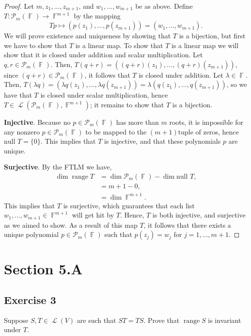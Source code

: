 \documentclass[letterpaper, 12pt]{amsart}
\DeclareMathOperator{\F}{\mathbb{F}}				%
\DeclareMathOperator{\Ell}{\mathscr{L}}				%
\renewcommand{\null}{\text{null }}					%
\DeclareMathOperator{\range}{\text{range }}			%
\theoremstyle{definition}  							%
\begin{document}
		\begin{proof}
		Let $m, z_{1}, \dots, z_{m+1}$, and $w_{1}, \dots, w_{m+1}$ be as above.
		Define $T : \mathcal{P}_{m}(\F) \to \F^{m+1}$ by the mapping $$Tp \mapsto (p(z_{1}), \dots, p(z_{m+1})) = (w_{1}, \dots, w_{m+1}).$$
		We will prove existence and uniqueness by showing that $T$ is a bijection, but first we have to show that $T$ is a linear map.
		To show that $T$ is a linear map we will show that it is closed under addition and scalar multiplication.
		Let $q,r \in \mathcal{P}_{m}(\F)$.
		Then, $T(q+r) = ((q+r)(z_{1}), \dots, (q+r)(z_{m+1}))$, since $(q+r) \in \mathcal{P}_{m}(\F)$, it follows that $T$ is closed under addition.
		Let $\lambda \in \F$.
		Then, $T(\lambda q) = (\lambda q(z_{1}), \dots, \lambda q(z_{m+1})) = \lambda (q(z_{1}), \dots, q(z_{m+1}))$, so we have that $T$ is closed under scalar multiplication, hence $T \in \Ell(\mathcal{P}_{m}(\F), \F^{m+1})$; it remains to show that $T$ is a bijection.

		\textbf{Injective}.
		Because no $p \in \mathcal{P}_{m}(\F)$ has more than $m$ roots, it is impossible for any nonzero $p \in \mathcal{P}_{m}(\F)$ to be mapped to the $(m+1)$tuple of zeros, hence $\null T = \{ 0 \}$.
		This implies that $T$ is injective, and that these polynomials $p$ are unique.

		\textbf{Surjective}.
		By the FTLM we have,
		\begin{align*}
			\dim \range T &= \dim \mathcal{P}_{m}(\F) - \dim \null T, \\
			&= m + 1 - 0, \\
			&= \dim \F^{m+1}.
		\end{align*}
		This implies that $T$ is surjective, which guarantees that each list $w_{1},\dots,w_{m+1} \in \F^{m+1}$ will get hit by $T$.
		Hence, $T$ is both injective, and surjective as we aimed to show.
		As a result of this map $T$, it follows that there exists a unique polynomial $p \in \mathcal{P}_{m}(\F)$ such that $p(z_{j}) = w_{j}$ for $j = 1, \dots, m+1$.	
		\end{proof}

	\section*{Section 5.A}
		\subsection*{Exercise 3}
		Suppose $S,T \in \Ell(V)$ are such that $ST = TS$. 
		Prove that $\range S$ is invariant under $T$.
\end{document}
